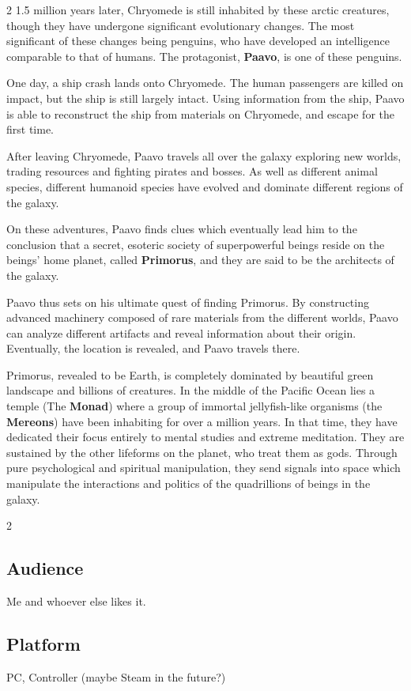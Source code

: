 \documentclass[10pt,a4paper]{article}
\begin{document}
\begin{multicols*}{2}
  1.5 million years later, Chryomede is still inhabited by these arctic creatures, though they have undergone significant evolutionary changes. The most significant of these changes being penguins, who have developed an intelligence comparable to that of humans. The protagonist, \textbf{Paavo}, is one of these penguins.

  One day, a ship crash lands onto Chryomede. The human passengers are killed on impact, but the ship is still largely intact. Using information from the ship, Paavo is able to reconstruct the ship from materials on Chryomede, and escape for the first time.

  After leaving Chryomede, Paavo travels all over the galaxy exploring new worlds, trading resources and fighting pirates and bosses. As well as different animal species, different humanoid species have evolved and dominate different regions of the galaxy.

  On these adventures, Paavo finds clues which eventually lead him to the conclusion that a secret, esoteric society of superpowerful beings reside on the beings' home planet, called \textbf{Primorus}, and they are said to be the architects of the galaxy.

  Paavo thus sets on his ultimate quest of finding Primorus. By constructing advanced machinery composed of rare materials from the different worlds, Paavo can analyze different artifacts and reveal information about their origin. Eventually, the location is revealed, and Paavo travels there. 

  Primorus, revealed to be Earth, is completely dominated by beautiful green landscape and billions of creatures. In the middle of the Pacific Ocean lies a temple (The \textbf{Monad}) where a group of immortal jellyfish-like organisms (the \textbf{Mereons}) have been inhabiting for over a million years. In that time, they have dedicated their focus entirely to mental studies and extreme meditation. They are sustained by the other lifeforms on the planet, who treat them as gods. Through pure psychological and spiritual manipulation, they send signals into space which manipulate the interactions and politics of the quadrillions of beings in the galaxy.

  \begin{multicols}{2}
    \subsection{Audience}
    Me and whoever else likes it.
    \columnbreak
    \subsection{Platform}
    PC, Controller (maybe Steam in the future?)
  \end{multicols}


\end{multicols*}
\end{document}
